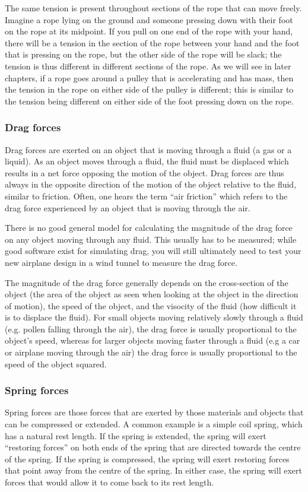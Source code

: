The same tension is present throughout sections of the rope that can move freely. Imagine a rope lying on the ground and someone pressing down with their foot on the rope at its midpoint. If you pull on one end of the rope with your hand, there will be a tension in the section of the rope between your hand and the foot that is pressing on the rope, but the other side of the rope will be slack; the tension is thus different in different sections of the rope. As we will see in later chapters, if a rope goes around a pulley that is accelerating and has mass, then the tension in the rope on either side of the pulley is different; this is similar to the tension being different on either side of the foot pressing down on the rope. 

\subsubsection{Drag forces}
Drag forces are exerted on an object that is moving through a fluid (a gas or a liquid). As an object moves through a fluid, the fluid must be displaced which results in a net force opposing the motion of the object. Drag forces are thus always in the opposite direction of the motion of the object relative to the fluid, similar to friction. Often, one hears the term ``air friction'' which refers to the drag force experienced by an object that is moving through the air. 

There is no good general model for calculating the magnitude of the drag force on any object moving through any fluid. This usually has to be measured; while good software exist for simulating drag, you will still ultimately need to test your new airplane design in a wind tunnel to measure the drag force.

 The magnitude of the drag force generally depends on the cross-section of the object (the area of the object as seen when looking at the object in the direction of motion), the speed of the object, and the visocity of the fluid (how difficult it is to displace the fluid). For small objects moving relatively slowly through a fluid (e.g. pollen falling through the air), the drag force is usually proportional to the object's speed, whereas for larger objects moving faster through a fluid (e.g a car or airplane moving through the air) the drag force is usually proportional to the speed of the object squared.

\subsubsection{Spring forces}
Spring forces are those forces that are exerted by those materials and objects that can be compressed or extended. A common example is a simple coil spring, which has a natural rest length. If the spring is extended, the spring will exert ``restoring forces'' on both ends of the spring that are directed towards the centre of the spring. If the spring is compressed, the spring will exert restoring forces that point away from the centre of the spring. In either case, the spring will exert forces that would allow it to come back to its rest length.


